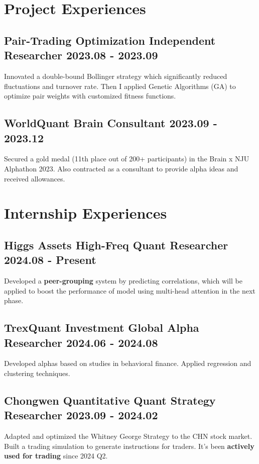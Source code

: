 \documentclass[a4paper]{article}
\begin{document}

\section{Project Experiences} %
\subsection{Pair-Trading Optimization \normalfont \hfill Independent Researcher \hspace{40pt} 2023.08 - 2023.09}
Innovated a double-bound Bollinger strategy which significantly reduced fluctuations and turnover rate. Then I applied Genetic Algorithms (GA) to optimize pair weights with customized fitness functions.

\subsection{WorldQuant Brain \normalfont \hfill Consultant\hspace{40pt} 2023.09 - 2023.12}
Secured a gold medal (11th place out of 200+ participants) in the Brain x NJU Alphathon 2023. Also contracted as a consultant to provide alpha ideas and received allowances.

\section{Internship Experiences} %
\subsection{Higgs Assets \normalfont \hfill High-Freq Quant Researcher \hspace{40pt} 2024.08 - Present}
Developed a \textbf{peer-grouping} system by predicting correlations, which will be applied to boost the performance of model using multi-head attention in the next phase. 
\subsection{TrexQuant Investment \normalfont \hfill Global Alpha Researcher \hspace{40pt} 2024.06 - 2024.08}
Developed alphas based on studies in behavioral finance. Applied regression and clustering techniques.
\subsection{Chongwen Quantitative \normalfont\hfill Quant Strategy Researcher  \hspace{40pt} 2023.09 - 2024.02}
Adapted and optimized the Whitney George Strategy to the CHN stock market. Built a trading simulation to generate instructions for traders. It's been \textbf{actively used for trading }since 2024 Q2.
\end{document}
